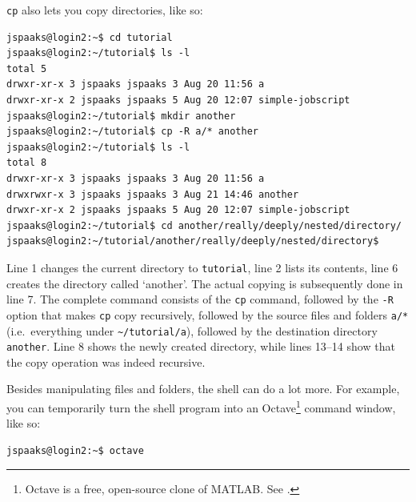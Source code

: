 \lstinline{cp} also lets you copy directories, like so:
\begin{lstlisting}[style=basic,style=bash,style=numbered]
jspaaks@login2:~$ cd tutorial
jspaaks@login2:~/tutorial$ ls -l
total 5
drwxr-xr-x 3 jspaaks jspaaks 3 Aug 20 11:56 a
drwxr-xr-x 2 jspaaks jspaaks 5 Aug 20 12:07 simple-jobscript
jspaaks@login2:~/tutorial$ mkdir another
jspaaks@login2:~/tutorial$ cp -R a/* another
jspaaks@login2:~/tutorial$ ls -l
total 8
drwxr-xr-x 3 jspaaks jspaaks 3 Aug 20 11:56 a
drwxrwxr-x 3 jspaaks jspaaks 3 Aug 21 14:46 another
drwxr-xr-x 2 jspaaks jspaaks 5 Aug 20 12:07 simple-jobscript
jspaaks@login2:~/tutorial$ cd another/really/deeply/nested/directory/
jspaaks@login2:~/tutorial/another/really/deeply/nested/directory$
\end{lstlisting}
Line 1 changes the current directory to \lstinline[style=bashinline]{tutorial}, line 2 lists its contents, line 6 creates the directory called `another'. The actual copying is subsequently done in line 7. The complete command consists of the \lstinline[style=bashinline]{cp} command, followed by the \lstinline[style=bashinline]{-R} option that makes \lstinline[style=bashinline]{cp} copy recursively, followed by the source files and folders \lstinline[style=bashinline]{a/*} (i.e.~everything under \lstinline[style=bashinline]{~/tutorial/a}), followed by the destination directory \lstinline[style=bashinline]{another}. Line 8 shows the newly created directory, while lines 13--14 show that the copy operation was indeed recursive.

Besides manipulating files and folders, the shell can do a lot more. For example, you can temporarily turn the shell program into an Octave\footnote{Octave is a free, open-source clone of MATLAB. See .} command window, like so:
\begin{lstlisting}[style=basic,style=bash]
jspaaks@login2:~$ octave
\end{lstlisting}

